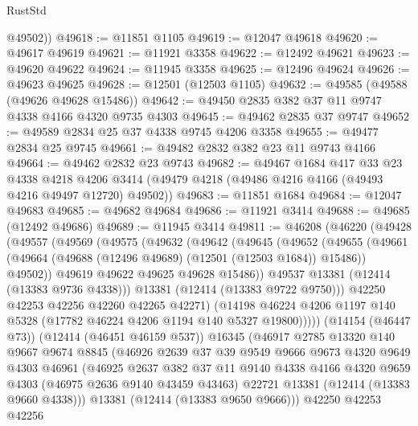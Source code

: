 \begin{lexlean}{RustStd}
\begin{coremodule}
        @49502))
@49618 := @11851 @1105
@49619 := @12047 @49618
@49620 := @49617 @49619
@49621 := @11921 @3358
@49622 := @12492 @49621
@49623 := @49620 @49622
@49624 := @11945 @3358
@49625 := @12496 @49624
@49626 := @49623 @49625
@49628 := @12501 (@12503 @1105)
@49632 := @49585 (@49588 (@49626 @49628 @15486))
@49642 := @49450 @2835 @382 @37 @11 @9747 @4338 @4166 @4320 @9735 @4303
@49645 := @49462 @2835 @37 @9747
@49652 := @49589 @2834 @25 @37 @4338 @9745 @4206 @3358
@49655 := @49477 @2834 @25 @9745
@49661 := @49482 @2832 @382 @23 @11 @9743 @4166
@49664 := @49462 @2832 @23 @9743
@49682 := @49467
    @1684
    @417
    @33
    @23
    @4338
    @4218
    @4206
    @3414
    (@49479 @4218 (@49486 @4216 @4166 (@49493 @4216 @49497 @12720) @49502))
@49683 := @11851 @1684
@49684 := @12047 @49683
@49685 := @49682 @49684
@49686 := @11921 @3414
@49688 := @49685 (@12492 @49686)
@49689 := @11945 @3414
@49811 := @46208
    (@46220
      (@49428
        (@49557
          (@49569
            (@49575
              (@49632
                (@49642
                  (@49645
                    (@49652
                      (@49655
                        (@49661
                          (@49664 (@49688 (@12496 @49689) (@12501 (@12503 @1684)) @15486))
                          @49502))
                      @49619
                      @49622
                      @49625
                      @49628
                      @15486))
                  @49537
                  @13381
                  (@12414 (@13383 @9736 @4338)))
                @13381
                (@12414 (@13383 @9722 @9750)))
              @42250
              @42253
              @42256
              @42260
              @42265
              @42271)
            (@14198 @46224 @4206 @1197 @140 @5328 (@17782 @46224 @4206 @1194 @140 @5327 @19800)))))
      (@14154 (@46447 @73))
      (@12414 (@46451 @46159 @537))
      @16345
      (@46917
        @2785
        @13320
        @140
        @9667
        @9674
        @8845
        (@46926
          @2639
          @37
          @39
          @9549
          @9666
          @9673
          @4320
          @9649
          @4303
          @46961
          (@46925
            @2637
            @382
            @37
            @11
            @9140
            @4338
            @4166
            @4320
            @9659
            @4303
            (@46975 @2636 @9140 @43459 @43463)
            @22721
            @13381
            (@12414 (@13383 @9660 @4338)))
          @13381
          (@12414 (@13383 @9650 @9666)))
        @42250
        @42253
        @42256

\end{coremodule}
\end{lexlean}
